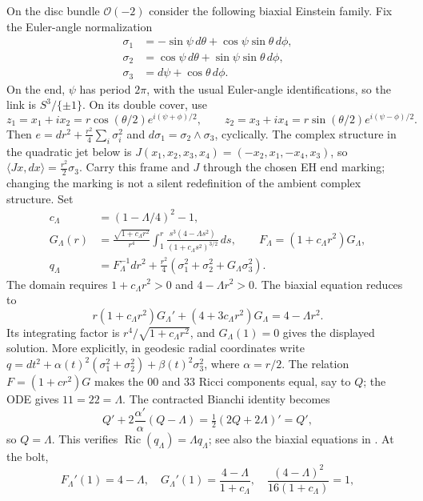 \documentclass[a4paper,11pt]{article}
\numberwithin{equation}{section}
\theoremstyle{definition}
\newcommand{\Ric}{\operatorname{Ric}}
\begin{document}
On the disc bundle $\mathcal O(-2)$ consider the following biaxial Einstein family.
Fix the Euler-angle normalization
\begin{equation}\label{eq:EH-frame-normalization}
\begin{split}
\sigma_1&=-\sin\psi\,d\theta+\cos\psi\sin\theta\,d\phi,\\
\sigma_2&=\cos\psi\,d\theta+\sin\psi\sin\theta\,d\phi,\\
\sigma_3&=d\psi+\cos\theta\,d\phi .
\end{split}
\end{equation}
On the end, $\psi$ has period $2\pi$, with the usual Euler-angle identifications, so the link is $S^3/\{\pm1\}$.
On its double cover, use
\[
z_1=x_1+ix_2=r\cos(\theta/2)e^{i(\psi+\phi)/2},\qquad
z_2=x_3+ix_4=r\sin(\theta/2)e^{i(\psi-\phi)/2}.
\]
Then $e=dr^2+\frac{r^2}{4}\sum_i\sigma_i^2$ and
$d\sigma_1=\sigma_2\wedge\sigma_3$, cyclically.
The complex structure in the quadratic jet below is
$J(x_1,x_2,x_3,x_4)=(-x_2,x_1,-x_4,x_3)$, so
$\langle Jx,dx\rangle=\frac{r^2}{2}\sigma_3$.
Carry this frame and $J$ through the chosen EH end marking; changing the marking is not a silent redefinition of the ambient complex structure.
Set
\begin{align}
c_\Lambda&=(1-\Lambda/4)^2-1,\\
G_\Lambda(r)&=\frac{\sqrt{1+c_\Lambda r^2}}{r^4}
\int_1^r\frac{s^3(4-\Lambda s^2)}{(1+c_\Lambda s^2)^{3/2}}\,ds,
\qquad F_\Lambda=(1+c_\Lambda r^2)G_\Lambda,\\
q_\Lambda&=F_\Lambda^{-1}dr^2+
\frac{r^2}{4}(\sigma_1^2+\sigma_2^2+G_\Lambda\sigma_3^2).
\end{align}
The domain requires $1+c_\Lambda r^2>0$ and $4-\Lambda r^2>0$. The biaxial equation reduces to
\[
r(1+c_\Lambda r^2)G_\Lambda'+(4+3c_\Lambda r^2)G_\Lambda
=4-\Lambda r^2.
\]
Its integrating factor is $r^4/\sqrt{1+c_\Lambda r^2}$, and $G_\Lambda(1)=0$ gives the displayed solution. More explicitly, in geodesic radial coordinates write
$q=dt^2+\alpha(t)^2(\sigma_1^2+\sigma_2^2)+\beta(t)^2\sigma_3^2$,
where $\alpha=r/2$. The relation $F=(1+cr^2)G$ makes the $00$ and $33$ Ricci components equal, say to $Q$; the ODE gives $11=22=\Lambda$. The contracted Bianchi identity becomes
\[
Q'+2\frac{\alpha'}{\alpha}(Q-\Lambda)=\tfrac12(2Q+2\Lambda)'=Q',
\]
so $Q=\Lambda$. This verifies $\Ric(q_\Lambda)=\Lambda q_\Lambda$; see also the biaxial equations in \cite[\S4.1]{CGLP}. At the bolt,
\[
F_\Lambda'(1)=4-\Lambda,
\quad G_\Lambda'(1)=\frac{4-\Lambda}{1+c_\Lambda},
\quad \frac{(4-\Lambda)^2}{16(1+c_\Lambda)}=1,
\]
\end{document}
